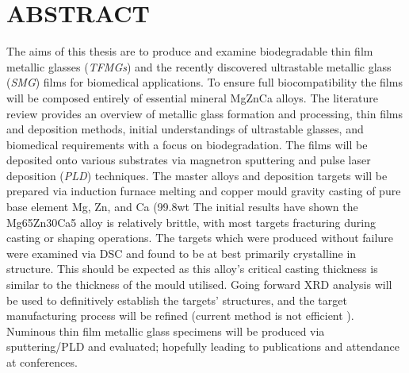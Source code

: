 \section{ABSTRACT}
 
The aims of this thesis are to produce and examine biodegradable thin film metallic glasses (\textit{TFMGs}) and the recently discovered ultrastable metallic glass (\textit{SMG}) films for biomedical applications. To ensure full biocompatibility the films will be composed entirely of essential mineral MgZnCa alloys.
The literature review provides an overview of metallic glass formation and processing, thin films and deposition methods, initial understandings of ultrastable glasses, and biomedical requirements with a focus on biodegradation. 
The films will be deposited onto various substrates via magnetron sputtering and pulse laser deposition (\textit{PLD}) techniques. The master alloys and deposition targets will be prepared via induction furnace melting and copper mould gravity casting of pure base element Mg, Zn, and Ca (99.8wt%
The initial results have shown the Mg65Zn30Ca5 alloy is relatively brittle, with most targets fracturing during casting or shaping operations. The targets which were produced without failure were examined via DSC and found to be at best primarily crystalline in structure. This should be expected as this alloy’s critical casting thickness is similar to the thickness of the mould utilised. 
Going forward XRD analysis will be used to definitively establish the targets’ structures, and the target manufacturing process will be refined (current method is not efficient ). Numinous thin film metallic glass specimens will be produced via sputtering/PLD and evaluated; hopefully leading to publications and attendance at conferences. 

